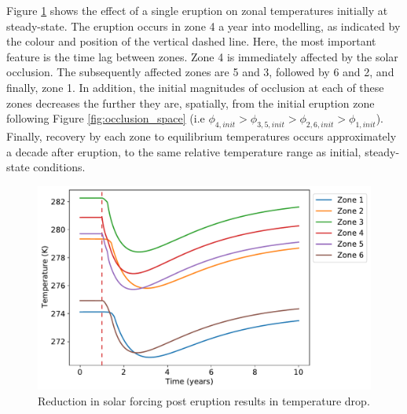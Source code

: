 \documentclass[12pt]{article}
\begin{document}
Figure \ref{fig:oneerupt} shows the effect of a single eruption on zonal 
temperatures initially at steady-state. The eruption occurs in zone 4 a year into
modelling, as indicated by the colour and position of the vertical dashed line. 
Here, the most important feature is the time lag between zones. Zone 4 is immediately 
affected by the solar occlusion. The subsequently affected zones are 5 and 3, followed 
by 6 and 2, and finally, zone 1. In addition, the initial magnitudes of occlusion 
at each of these zones decreases the further they are, spatially, from the 
initial eruption zone following Figure \ref{fig:occlusion_space}
(i.e $\phi_{4,init} > \phi_{3,5,init} > \phi_{2,6,init} > \phi_{1,init}$).
Finally, recovery by each zone to equilibrium temperatures occurs approximately 
a decade after eruption, to the same relative temperature range as initial, 
steady-state conditions.

\begin{figure}[H]
    \centering
    \includegraphics[scale=0.6]{one_eruption.pdf}
    \caption{
        Reduction in solar forcing post eruption results in temperature drop.
    }
    \label{fig:oneerupt}
\end{figure}
\FloatBarrier
\end{document}
